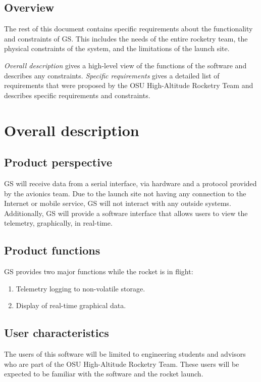 \documentclass[10pt,journal,draftclsnofoot,onecolumn]{IEEEtran}
\begin{document}
	\subsection{Overview}
	The rest of this document contains specific requirements about the functionality and constraints of GS. This includes
	the needs of the entire rocketry team, the physical constraints of the system, and the limitations of the launch site.
	
	\textit{Overall description} gives a high-level view of the functions of the software and describes any constraints.
	\textit{Specific requirements} gives a detailed list of requirements that were proposed by the OSU High-Altitude
	Rocketry Team and describes specific requirements and constraints.
		
	
	\section{Overall description}
	\subsection{Product perspective}
	GS will receive data from a serial interface, via hardware and a protocol provided by the avionics team.
	Due to the launch site not having any connection to the Internet or mobile service, GS will not interact with
	any outside systems. 
	Additionally, GS will provide a software interface that allows users to view the telemetry,
	graphically, in real-time.
	\subsection{Product functions}
	GS provides two major functions while the rocket is in flight:
	
	\begin{enumerate}
		\item Telemetry logging to non-volatile storage.
		\item Display of real-time graphical data. 
	\end{enumerate}
	
	\subsection{User characteristics}
	The users of this software will be limited to engineering students and advisors who are part of the OSU High-Altitude
	Rocketry Team.
	These users will be expected to be familiar with the software and the rocket launch.
	
\end{document}
